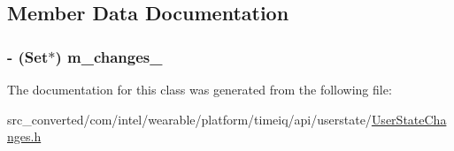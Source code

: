 \subsection{Member Data Documentation}
\hypertarget{interface_user_state_changes_ab848fb92b5c1da84f1f903ba4f65381e}{}
\subsubsection[{m\+\_\+changes\+\_\+}]{\setlength{\rightskip}{0pt plus 5cm}-\/ (Set$\ast$) m\+\_\+changes\+\_\+}\label{interface_user_state_changes_ab848fb92b5c1da84f1f903ba4f65381e}


The documentation for this class was generated from the following file\+:\begin{DoxyCompactItemize}
\item 
src\+\_\+converted/com/intel/wearable/platform/timeiq/api/userstate/\hyperlink{_user_state_changes_8h}{User\+State\+Changes.\+h}\end{DoxyCompactItemize}
